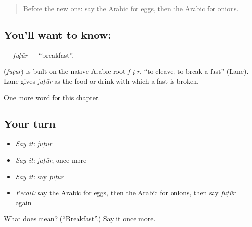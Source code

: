 \label{lesson:AR-C68-futur}



\begin{quote}
Before the new one: say the Arabic for eggs, then the Arabic for onions.
\end{quote}

\subsection*{You'll want to know: }
\textbf{} — \emph{fuṭūr} — \textquotedblleft{}breakfast\textquotedblright{}.

\begin{cousinweb}
\textbf{} (\emph{fuṭūr}) is built on the native Arabic root \emph{f-ṭ-r}, \textquotedblleft{}to cleave; to break a fast\textquotedblright{} (Lane). Lane gives \emph{fuṭūr} as the food or drink with which a fast is broken.
\end{cousinweb}

\begin{grammarlens}[title={What you've built}]
One more word for this chapter.
\end{grammarlens}

\subsection*{Your turn}
\begin{itemize}
\raggedright
  \item \emph{Say it:} \emph{fuṭūr}
  \item \emph{Say it:} \emph{fuṭūr}, once more
  \item \emph{Say it:} say \emph{fuṭūr}
  \item \emph{Recall:} say the Arabic for eggs, then the Arabic for onions, then say \emph{fuṭūr} again
\end{itemize}

\begin{tcolorbox}[breakable,colback=teal!4,colframe=teal!35!black,title={Before you move on}]
What does  mean? (\textquotedblleft{}Breakfast\textquotedblright{}.) Say it once more.
\end{tcolorbox}
